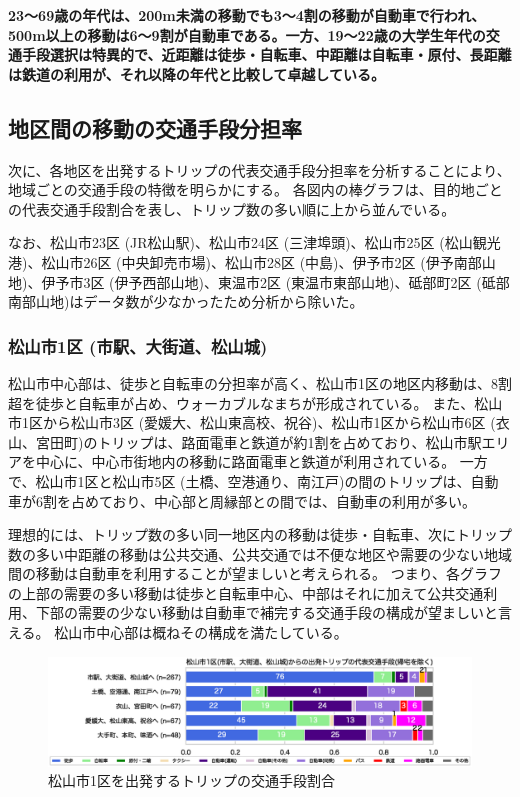 \documentclass[a4paper,12pt, uplatex]{jsbook}
\begin{document}
\color{red}
\begin{framed}
\noindent
\textbf{\large 23〜69歳の年代は、200m未満の移動でも3〜4割の移動が自動車で行われ、500m以上の移動は6〜9割が自動車である。一方、19〜22歳の大学生年代の交通手段選択は特異的で、近距離は徒歩・自転車、中距離は自転車・原付、長距離は鉄道の利用が、それ以降の年代と比較して卓越している。}
\end{framed}
\color{black}


\clearpage
\subsection{地区間の移動の交通手段分担率}
次に、各地区を出発するトリップの代表交通手段分担率を分析することにより、地域ごとの交通手段の特徴を明らかにする。
各図内の棒グラフは、目的地ごとの代表交通手段割合を表し、トリップ数の多い順に上から並んでいる。

なお、松山市23区 (JR松山駅)、松山市24区 (三津埠頭)、松山市25区 (松山観光港)、松山市26区 (中央卸売市場)、松山市28区 (中島)、伊予市2区 (伊予南部山地)、伊予市3区 (伊予西部山地)、東温市2区 (東温市東部山地)、砥部町2区 (砥部南部山地)はデータ数が少なかったため分析から除いた。

\subsubsection{松山市1区 (市駅、大街道、松山城)}
松山市中心部は、徒歩と自転車の分担率が高く、松山市1区の地区内移動は、8割超を徒歩と自転車が占め、ウォーカブルなまちが形成されている。
また、松山市1区から松山市3区 (愛媛大、松山東高校、祝谷)、松山市1区から松山市6区 (衣山、宮田町)のトリップは、路面電車と鉄道が約1割を占めており、松山市駅エリアを中心に、中心市街地内の移動に路面電車と鉄道が利用されている。
一方で、松山市1区と松山市5区 (土橋、空港通り、南江戸)の間のトリップは、自動車が6割を占めており、中心部と周縁部との間では、自動車の利用が多い。

理想的には、トリップ数の多い同一地区内の移動は徒歩・自転車、次にトリップ数の多い中距離の移動は公共交通、公共交通では不便な地区や需要の少ない地域間の移動は自動車を利用することが望ましいと考えられる。
つまり、各グラフの上部の需要の多い移動は徒歩と自転車中心、中部はそれに加えて公共交通利用、下部の需要の少ない移動は自動車で補完する交通手段の構成が望ましいと言える。
松山市中心部は概ねその構成を満たしている。
%
\begin{figure}[H]
    \centering
    \includegraphics[width=1.0\textwidth]{picture/mode_share_松山市1区.eps}
    \caption{松山市1区を出発するトリップの交通手段割合}
    \label{fig:mode_share_1}
\end{figure}
\end{document}
